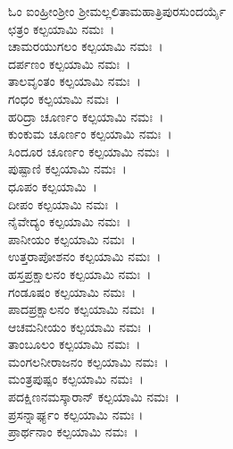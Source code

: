 ಓಂ ಐಂಹ್ರೀಂಶ್ರೀಂ ಶ್ರೀಮಲ್ಲಲಿತಾಮಹಾತ್ರಿಪುರಸುಂದರ್ಯೈ \\
ಛತ್ರಂ ಕಲ್ಪಯಾಮಿ ನಮಃ~।\\
ಚಾಮರಯುಗಲಂ ಕಲ್ಪಯಾಮಿ ನಮಃ~।\\
ದರ್ಪಣಂ ಕಲ್ಪಯಾಮಿ ನಮಃ~।\\
ತಾಲವೃಂತಂ ಕಲ್ಪಯಾಮಿ ನಮಃ~।\\
ಗಂಧಂ ಕಲ್ಪಯಾಮಿ ನಮಃ~।\\
ಹರಿದ್ರಾ ಚೂರ್ಣಂ ಕಲ್ಪಯಾಮಿ ನಮಃ~।\\
ಕುಂಕುಮ ಚೂರ್ಣಂ ಕಲ್ಪಯಾಮಿ ನಮಃ~।\\
ಸಿಂದೂರ ಚೂರ್ಣಂ ಕಲ್ಪಯಾಮಿ ನಮಃ~।\\
ಪುಷ್ಪಾಣಿ ಕಲ್ಪಯಾಮಿ ನಮಃ~।\\
ಧೂಪಂ ಕಲ್ಪಯಾಮಿ~।\\
ದೀಪಂ ಕಲ್ಪಯಾಮಿ ನಮಃ~।\\
ನೈವೇದ್ಯಂ ಕಲ್ಪಯಾಮಿ ನಮಃ~।\\
ಪಾನೀಯಂ ಕಲ್ಪಯಾಮಿ ನಮಃ~।\\
ಉತ್ತರಾಪೋಶನಂ ಕಲ್ಪಯಾಮಿ ನಮಃ~।\\
ಹಸ್ತಪ್ರಕ್ಷಾಲನಂ ಕಲ್ಪಯಾಮಿ ನಮಃ~।\\
ಗಂಡೂಷಂ ಕಲ್ಪಯಾಮಿ ನಮಃ~।\\
ಪಾದಪ್ರಕ್ಷಾಲನಂ ಕಲ್ಪಯಾಮಿ ನಮಃ~।\\
ಆಚಮನೀಯಂ ಕಲ್ಪಯಾಮಿ ನಮಃ~।\\
ತಾಂಬೂಲಂ ಕಲ್ಪಯಾಮಿ ನಮಃ~।\\
ಮಂಗಲನೀರಾಜನಂ ಕಲ್ಪಯಾಮಿ ನಮಃ~।\\
ಮಂತ್ರಪುಷ್ಪಂ ಕಲ್ಪಯಾಮಿ ನಮಃ~।\\
ಪದಕ್ಷಿಣನಮಸ್ಕಾರಾನ್ ಕಲ್ಪಯಾಮಿ ನಮಃ~।\\
ಪ್ರಸನ್ನಾರ್ಘ್ಯಂ ಕಲ್ಪಯಾಮಿ ನಮಃ ।\\
ಪ್ರಾರ್ಥನಾಂ ಕಲ್ಪಯಾಮಿ ನಮಃ~।
